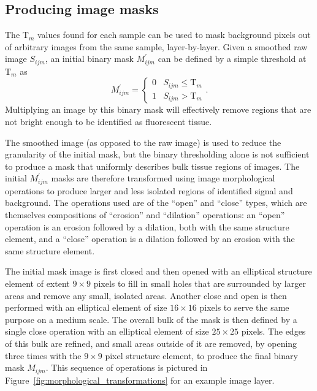 \documentclass[letterpaper,11pt]{article}
\newcommand{\reffig}[1]{Figure~\ref{#1}}
\newcommand{\Tau}{\mathrm{T}}
\begin{document}
\subsection{Producing image masks}
\label{ssec:producing_image_masks}

The $\Tau_{m}$ values found for each sample can be used to mask background pixels out of arbitrary images from the same sample, layer-by-layer. Given a smoothed raw image $S_{ijm}$, an initial binary mask $M^{\prime}_{ijm}$ can be defined by a simple threshold at $\Tau_{m}$ as
\begin{equation}
M^{\prime}_{ijm} = 
\begin{cases} 
      0 & S_{ijm} \leq \Tau_{m} \\
      1 & S_{ijm} > \Tau_{m} 
\end{cases}
 .
\end{equation}
Multiplying an image by this binary mask will effectively remove regions that are not bright enough to be identified as fluorescent tissue.

The smoothed image (as opposed to the raw image) is used to reduce the granularity of the initial mask, but the binary thresholding alone is not sufficient to produce a mask that uniformly describes bulk tissue regions of images. The initial $M^{\prime}_{ijm}$ masks are therefore transformed using image morphological operations \cite{opencv_mt} to produce larger and less isolated regions of identified signal and background. The operations used are of the ``open'' and ``close'' types, which are themselves compositions of ``erosion'' and ``dilation'' operations: an ``open'' operation is an erosion followed by a dilation, both with the same structure element, and a ``close'' operation is a dilation followed by an erosion with the same structure element.

The initial mask image is first closed and then opened with an elliptical structure element of extent $9 \times 9$ pixels to fill in small holes that are surrounded by larger areas and remove any small, isolated areas. Another close and open is then performed with an elliptical element of size $16 \times 16$ pixels to serve the same purpose on a medium scale. The overall bulk of the mask is then defined by a single close operation with an elliptical element of size $25 \times 25$ pixels. The edges of this bulk are refined, and small areas outside of it are removed, by opening three times with the $9 \times 9$ pixel structure element, to produce the final binary mask $M_{ijm}$. This sequence of operations is pictured in \reffig{fig:morphological_transformations} for an example image layer. 
\end{document}

